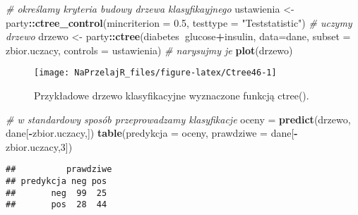 \documentclass[polish,]{book}
\newenvironment{Shaded}{\begin{snugshade}}{\end{snugshade}}
\newcommand{\CommentTok}[1]{\textcolor[rgb]{0.56,0.35,0.01}{\textit{#1}}}
\newcommand{\DataTypeTok}[1]{\textcolor[rgb]{0.13,0.29,0.53}{#1}}
\newcommand{\DecValTok}[1]{\textcolor[rgb]{0.00,0.00,0.81}{#1}}
\newcommand{\FloatTok}[1]{\textcolor[rgb]{0.00,0.00,0.81}{#1}}
\newcommand{\KeywordTok}[1]{\textcolor[rgb]{0.13,0.29,0.53}{\textbf{#1}}}
\newcommand{\NormalTok}[1]{#1}
\newcommand{\OperatorTok}[1]{\textcolor[rgb]{0.81,0.36,0.00}{\textbf{#1}}}
\newcommand{\StringTok}[1]{\textcolor[rgb]{0.31,0.60,0.02}{#1}}
\begin{document}
\begin{Shaded}
\begin{Highlighting}[]
\CommentTok{# określamy kryteria budowy drzewa klasyfikayjnego}
\NormalTok{ustawienia <-}\StringTok{ }\NormalTok{party}\OperatorTok{::}\KeywordTok{ctree_control}\NormalTok{(}\DataTypeTok{mincriterion =} \FloatTok{0.5}\NormalTok{, }\DataTypeTok{testtype =} \StringTok{"Teststatistic"}\NormalTok{)}
\CommentTok{# uczymy drzewo}
\NormalTok{drzewo <-}\StringTok{ }\NormalTok{party}\OperatorTok{::}\KeywordTok{ctree}\NormalTok{(diabetes}\OperatorTok{~}\NormalTok{glucose}\OperatorTok{+}\NormalTok{insulin,}
                       \DataTypeTok{data=}\NormalTok{dane, }\DataTypeTok{subset =}\NormalTok{ zbior.uczacy, }\DataTypeTok{controls =}\NormalTok{ ustawienia)}
\CommentTok{# narysujmy je}
\KeywordTok{plot}\NormalTok{(drzewo)}
\end{Highlighting}
\end{Shaded}

\begin{figure}[h]

{\centering \texttt{[image: NaPrzelajR\_files/figure-latex/Ctree46-1]} 

}

\caption{Przykładowe drzewo klasyfikacyjne wyznaczone funkcją ctree().}\label{fig:Ctree46}
\end{figure}

\begin{Shaded}
\begin{Highlighting}[]
\CommentTok{# w standardowy sposób przeprowadzamy klasyfikacje}
\NormalTok{oceny =}\StringTok{ }\KeywordTok{predict}\NormalTok{(drzewo, dane[}\OperatorTok{-}\NormalTok{zbior.uczacy,])}
\KeywordTok{table}\NormalTok{(}\DataTypeTok{predykcja =}\NormalTok{ oceny, }\DataTypeTok{prawdziwe =}\NormalTok{ dane[}\OperatorTok{-}\NormalTok{zbior.uczacy,}\DecValTok{3}\NormalTok{])}
\end{Highlighting}
\end{Shaded}

\begin{verbatim}
##          prawdziwe
## predykcja neg pos
##       neg  99  25
##       pos  28  44
\end{verbatim}
\end{document}
